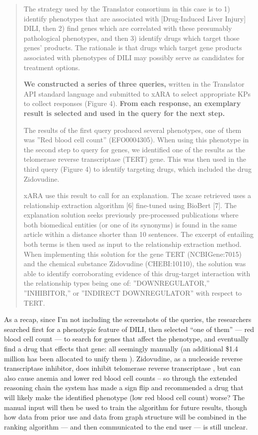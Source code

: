\documentclass[10pt]{tufte-book}
\begin{document}
\begin{quote}
The strategy used by the Translator consortium in this case is to 1)
identify phenotypes that are associated with {[}Drug-Induced Liver
Injury{]} DILI, then 2) find genes which are correlated with these
presumably pathological phenotypes, and then 3) identify drugs which
target those genes' products. The rationale is that drugs which target
gene products associated with phenotypes of DILI may possibly serve as
candidates for treatment options.

\textbf{We constructed a series of three queries,} written in the
Translator API standard language and submitted to xARA to select
appropriate KPs to collect responses (Figure 4). \textbf{From each
response, an exemplary result is selected and used in the query for the
next step.}

The results of the first query produced several phenotypes, one of them
was ''Red blood cell count'' (EFO0004305). When using this phenotype in
the second step to query for genes, we identified one of the results as
the telomerase reverse transcriptase (TERT) gene. This was then used in
the third query (Figure 4) to identify targeting drugs, which included
the drug Zidovudine.

xARA use this result to call for an explanation. The xcase retrieved
uses a relationship extraction algorithm {[}6{]} fine-tuned using
BioBert {[}7{]}. The explanation solution seeks previously pre-processed
publications where both biomedical entities (or one of its synonyms) is
found in the same article within a distance shorter than 10 sentences.
The excerpt of entailing both terms is then used as input to the
relationship extraction method. When implementing this solution for the
gene TERT (NCBIGene:7015) and the chemical substance Zidovudine
(CHEBI:10110), the solution was able to identify corroborating evidence
of this drug-target interaction with the relationship types being one
of: ''DOWNREGULATOR,'' ''INHIBITOR,'' or ''INDIRECT DOWNREGULATOR'' with
respect to TERT. \citep{goelExplanationContainerCaseBased2021} 
\end{quote}

As a recap, since I'm not including the screenshots of the queries, the
researchers searched first for a phenotypic feature of DILI, then
selected ``one of them'' --- red blood cell count --- to search for
genes that affect the phenotype, and eventually find a drug that effects
that gene: all seemingly manually (an additional \$1.4 million has been
allocated to unify them \citep{haendelCommonDialectInfrastructure2021} ). Zidovudine, as a nucleoside reverse transcriptase inhibitor, does
inhibit telomerase reverse transcriptase \citep{hukezalieVitroExVivo2012} , but can also cause anemia and lower red
blood cell counts \citep{ZidovudinePatientNIH}  -- so through the
extended reasoning chain the system has made a sign flip and recommended
a drug that will likely make the identified phenotype (low red blood
cell count) worse? The manual input will then be used to train the
algorithm for future results, though how data from prior use and data
from graph structure will be combined in the ranking algorithm --- and
then communicated to the end user --- is still unclear.
\end{document}
